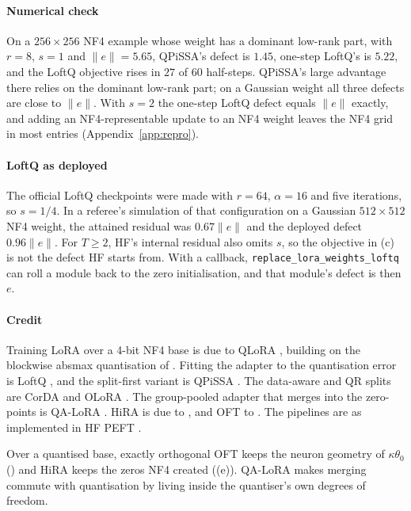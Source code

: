 \paragraph{Numerical check} On a $256\times256$ NF4 example whose weight has a dominant low-rank part, with $r=8$,
$s=1$ and $\lVert e\rVert=5.65$, QPiSSA's defect is $1.45$, one-step LoftQ's is $5.22$, and the LoftQ objective rises
in $27$ of $60$ half-steps. QPiSSA's large advantage there relies on the dominant low-rank part; on a Gaussian weight
all three defects are close to $\lVert e\rVert$. With $s=2$ the one-step LoftQ defect equals $\lVert e\rVert$ exactly,
and adding an NF4-representable update to an NF4 weight leaves the NF4 grid in most entries
(Appendix~\ref{app:repro}).

\paragraph{LoftQ as deployed} The official LoftQ checkpoints were made with $r=64$, $\alpha=16$ and five iterations,
so $s=1/4$. In a referee's simulation of that configuration on a Gaussian $512\times512$ NF4 weight, the attained
residual was $0.67\lVert e\rVert$ and the deployed defect $0.96\lVert e\rVert$. For $T\ge2$, HF's internal residual also
omits $s$, so the objective in (c) is not the defect HF starts from. With a callback,
\texttt{replace\_\allowbreak lora\_\allowbreak weights\_\allowbreak loftq} can roll a module back to the zero
initialisation, and that module's defect is then $e$.

\paragraph{Credit} Training LoRA over a 4-bit NF4 base is due to QLoRA \citep{dettmers2023qlora}, building on the
blockwise absmax quantisation of \citet{dettmers20218}. Fitting the adapter to the quantisation error is LoftQ
\citep{li2023loftq}, and the split-first variant is QPiSSA \citep{meng2024pissa}. The data-aware and QR splits are CorDA
\citep{yang2024corda} and OLoRA \citep{buyukakyuz2024olora}. The group-pooled adapter that merges into the zero-points
is QA-LoRA \citep{xu2023qa}. HiRA is due to \citet{huang2025hira}, and OFT to \citet{qiu2023controlling}. The pipelines
are as implemented in HF PEFT \citep{xmangrulkar2022peft}.

\begin{explains}
Over a quantised base, exactly orthogonal OFT keeps the neuron geometry of $\kappa\theta_0$ ()
and HiRA keeps the zeros NF4 created ((e)). QA-LoRA makes merging commute with quantisation
by living inside the quantiser's own degrees of freedom.
\end{explains}

